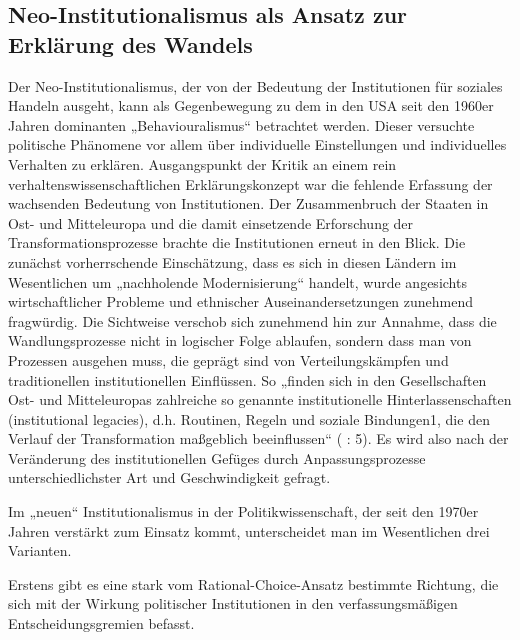\subsection{Neo-Institutionalismus als Ansatz zur Erklärung des Wandels}
Der Neo-Institutionalismus, der von der Bedeutung der Institutionen für soziales Handeln ausgeht, kann als Gegenbewegung zu dem in den USA seit den 1960er Jahren dominanten „Behaviouralismus“ betrachtet werden. Dieser versuchte politische Phänomene vor allem über individuelle Einstellungen und individuelles Verhalten zu erklären. Ausgangspunkt der Kritik an einem rein verhaltenswissenschaftlichen Erklärungskonzept war die fehlende Erfassung der wachsenden Bedeutung von Institutionen. Der Zusammenbruch der Staaten in Ost- und Mitteleuropa und die damit einsetzende Erforschung der Transformationsprozesse brachte die Institutionen erneut in den Blick. Die zunächst vorherrschende Einschätzung, dass es sich in diesen Ländern im Wesentlichen um „nachholende Modernisierung“ handelt, wurde angesichts wirtschaftlicher Probleme und ethnischer Auseinandersetzungen zunehmend fragwürdig. Die Sichtweise verschob sich zunehmend hin zur Annahme, dass die Wandlungsprozesse nicht in logischer Folge ablaufen, sondern dass man von Prozessen ausgehen muss, die geprägt sind von Verteilungskämpfen und traditionellen institutionellen Einflüssen. So „finden sich in den Gesellschaften Ost- und Mitteleuropas zahlreiche so genannte institutionelle Hinterlassenschaften (institutional legacies), d.h. Routinen, Regeln und soziale Bindungen1, die den Verlauf der Transformation maßgeblich beeinflussen“ (\cite{schulze} : 5). Es wird also nach der Veränderung des institutionellen Gefüges durch Anpassungsprozesse unterschiedlichster Art und Geschwindigkeit gefragt. \par
Im „neuen“ Institutionalismus in der Politikwissenschaft, der seit den 1970er Jahren verstärkt zum Einsatz kommt, unterscheidet man im Wesentlichen drei Varianten.\par
Erstens gibt es eine stark vom Rational-Choice-Ansatz bestimmte Richtung, die sich mit der Wirkung politischer Institutionen in den verfassungsmäßigen Entscheidungsgremien befasst.
